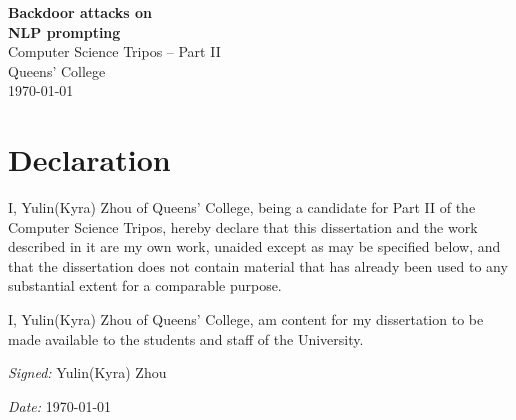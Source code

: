 \documentclass[12pt,a4paper,twoside,openright]{report}
\begin{document}

\pagestyle{empty}


\vspace*{60mm}
\begin{center}
	\Huge
	\textbf{Backdoor attacks on \\ NLP prompting} \\[10mm]
	\huge
	Computer Science Tripos -- Part II \\[4mm]
	Queens' College \\[4mm]
	\today \\[95mm]
\end{center}

\thispagestyle{empty}


\pagestyle{plain}

\setcounter{page}{1}

\section*{Declaration}

 {
  \setlength{\parskip}{\bigskipamount}

  I, Yulin(Kyra) Zhou of Queens' College, being a candidate for Part II of the
  Computer Science Tripos, hereby declare that this dissertation and the work
  described in it are my own work, unaided except as may be specified below, and
  that the dissertation does not contain material that has already been used to
  any substantial extent for a comparable purpose.

  I, Yulin(Kyra) Zhou of Queens' College, am content for my dissertation to be
  made available to the students and staff of the University.

  \emph{Signed:} Yulin(Kyra) Zhou

  \setlength{\parskip}{\smallskipamount}

  \emph{Date:} \today
 }

\end{document}

